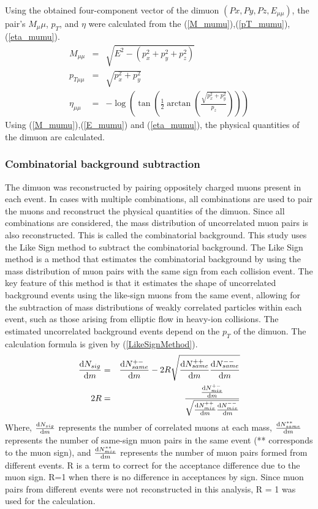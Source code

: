                 Using the obtained four-component vector of the dimuon $(Px, Py, Pz, E_{\mu\mu})$, the pair's $M_\mu\mu$, $p_T$, and $\eta$ were calculated from the (\ref{M_mumu}),(\ref{pT_mumu}),(\ref{eta_mumu}).
                \begin{eqnarray}
                    M_{\mu\mu} &=& \sqrt{E^2 - (p_x^2 + p_y^2 + p_z^2)}\\ \label{M_mumu}
                    p_{T\mu\mu} &=& \sqrt{p_x^2 + p_y^2}\\ \label{pT_mumu}
                    \eta_{\mu\mu} &=& -\log\left(\tan\left(\frac{1}{2}\arctan\left(\frac{\sqrt{p_x^2 + p_y^2}}{p_z}\right)\right)\right) \label{eta_mumu}
                \end{eqnarray}
                Using (\ref{M_mumu}),(\ref{E_mumu}) and (\ref{eta_mumu}), the physical quantities of the dimuon are calculated.
                
            \subsubsection{Combinatorial background subtraction}
            \label{Analysis:Dimuon:Combinatorial BG subtraction}
                The dimuon was reconstructed by pairing oppositely charged muons present in each event. In cases with multiple combinations, all combinations are used to pair the muons and reconstruct the physical quantities of the dimuon. Since all combinations are considered, the mass distribution of uncorrelated muon pairs is also reconstructed. This is called the combinatorial background. This study uses the Like Sign method to subtract the combinatorial background. The Like Sign method is a method that estimates the combinatorial background by using the mass distribution of muon pairs with the same sign from each collision event. The key feature of this method is that it estimates the shape of uncorrelated background events using the like-sign muons from the same event, allowing for the subtraction of mass distributions of weakly correlated particles within each event, such as those arising from elliptic flow in heavy-ion collisions. The estimated uncorrelated background events depend on the $p_T$ of the dimuon.
                The calculation formula is given by (\ref{LikeSignMethod}).
                \begin{eqnarray}
                    \label{LikeSignMethod}
                    \dv{N_{sig}}{m} &=& \dv{N_{same}^{+-}}{m} - 2R \sqrt{\dv{N_{same}^{++}}{m} \dv{N_{same}^{--}}{m}}\\
                    2R &=& \frac{\dv{N_{mix}^{+-}}{m}}{\sqrt{\dv{N_{mix}^{++}}{m} \dv{N_{mix}^{--}}{m}}} 
                \end{eqnarray}
                Where, $\dv{N_{sig}}{m}$ represents the number of correlated muons at each mass, $\dv{N_{same}^{**}}{m}$ represents the number of same-sign muon pairs in the same event (** corresponds to the muon sign), and $\dv{N_{mix}^{**}}{m}$ represents the number of muon pairs formed from different events. R is a term to correct for the acceptance difference due to the muon sign. R=1 when there is no difference in acceptances by sign. Since muon pairs from different events were not reconstructed in this analysis, R = 1 was used for the calculation.

